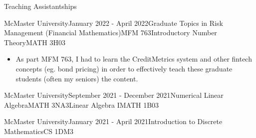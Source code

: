 \begin{rSection}{Teaching Assistantships}

\begin{taSubsectionFull}{McMaster University}{January 2022 - April 2022}{Graduate Topics in Risk Management (Financial Mathematics)}{MFM 763}{Introductory Number Theory}{MATH 3H03}
    \begin{itemize}
      \item As part MFM 763, I had to learn the CreditMetrics system and other fintech concepts (eg. bond pricing) in order to effectively teach these graduate students (often my seniors) the content.
    \end{itemize}
\end{taSubsectionFull}

\begin{taSubsectionFull}{McMaster University}{September 2021 - December 2021}{Numerical Linear Algebra}{MATH 3NA3}{Linear Algebra I}{MATH 1B03}
\end{taSubsectionFull}

\begin{taSubsectionMin}{McMaster University}{January 2021 - April 2021}{Introduction to Discrete Mathematics}{CS 1DM3}
\end{taSubsectionMin}

\end{rSection}